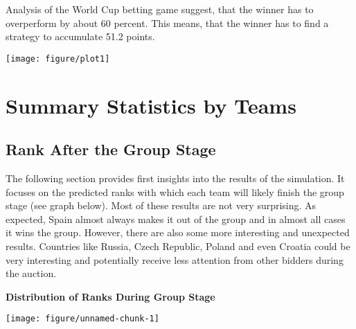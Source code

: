 \documentclass{article}\usepackage[]{graphicx}\usepackage[]{color}
\makeatletter
\def\maxwidth{ %
  \ifdim\Gin@nat@width>\linewidth
    \linewidth
  \else
    \Gin@nat@width
  \fi
}
\newenvironment{knitrout}{}{} %
\makeatother
\begin{document}
Analysis of the World Cup betting game suggest, that the winner has to overperform by about 60 percent. This means, that the winner has to find a strategy to accumulate 51.2 points.






\begin{center}

\begin{knitrout}
\color{fgcolor}
\texttt{[image: figure/plot1]} 

\end{knitrout}


\end{center}

\section{Summary Statistics by Teams}  %
\subsection{Rank After the Group Stage} %

The following section provides first insights into the results of the simulation. It focuses on the predicted ranks with which each team will likely finish the group stage (see graph below). Most of these results are not very surprising. As expected, Spain almost always makes it out of the group and in almost all cases it wins the group. However, there are also some more interesting and unexpected results. Countries like Russia, Czech Republic, Poland and even Croatia could be very interesting and potentially receive less attention from other bidders during the auction.

\newpage


\begin{center}

\bf{Distribution of Ranks During Group Stage}



\begin{knitrout}
\color{fgcolor}
\texttt{[image: figure/unnamed-chunk-1]} 

\end{knitrout}

\end{center}
\end{document}
